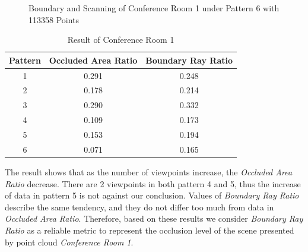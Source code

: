 \documentclass[11pt, a4paper,oneside,chapterprefix=false]{scrbook}
\begin{document}
\begin{figure}[H]
    \centering
      \label{fig:conf1 b 6} \hfill
     \label{fig:conf1 s 6}
    \caption{Boundary and Scanning of Conference Room 1 under Pattern 6 with 113358 Points}
    \label{fig:conf1 6}
\end{figure}

\begin{table}[H]
    \centering
    \begin{tabular}{|c|c|c|}
        \hline
        \textbf{Pattern} & \textbf{Occluded Area Ratio} & \textbf{Boundary Ray Ratio} \\
        \hline
        1 & 0.291 & 0.248 \\
        2 & 0.178 & 0.214 \\
		3 & 0.290 & 0.332 \\
		4 & 0.109 & 0.173 \\
        5 & 0.153 & 0.194 \\
        6 & 0.071 & 0.165 \\
        \hline
    \end{tabular}
    \caption{Result of Conference Room 1}
    \label{tab:result of conference room 1}
\end{table}

The result shows that as the number of viewpoints increase, the \emph{Occluded Area Ratio} decrease. There are 2 viewpoints in both pattern 4 and 5, thus the increase of data in pattern 5 is not against our conclusion. Values of \emph{Boundary Ray Ratio} describe the same tendency, and they do not differ too much from data in \emph{Occluded Area Ratio}. Therefore, based on these results we consider \emph{Boundary Ray Ratio} as a reliable metric to represent the occlusion level of the scene presented by point cloud \emph{Conference Room 1}.       
\end{document}
